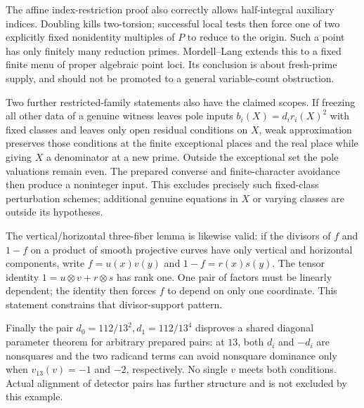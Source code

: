 \documentclass[11pt,a4paper]{article}
\begin{document}
The affine index-restriction proof also correctly allows half-integral
auxiliary indices. Doubling kills two-torsion; successful local tests
then force one of two explicitly fixed nonidentity multiples of $P$ to
reduce to the origin. Such a point has only finitely many reduction
primes. Mordell--Lang extends this to a fixed finite menu of proper
algebraic point loci. Its conclusion is about fresh-prime supply, and
should not be promoted to a general variable-count obstruction.

Two further restricted-family statements also have the claimed scopes.
If freezing all other data of a genuine witness leaves pole inputs
$b_i(X)=d_i r_i(X)^2$ with fixed classes and leaves only open residual
conditions on $X$, weak approximation preserves those conditions at the
finite exceptional places and the real place while giving $X$ a
denominator at a new prime. Outside the exceptional set the pole
valuations remain even. The prepared converse and finite-character
avoidance then produce a noninteger input. This excludes precisely such
fixed-class perturbation schemes; additional genuine equations in $X$
or varying classes are outside its hypotheses.

The vertical/horizontal three-fiber lemma is likewise valid: if the
divisors of $f$ and $1-f$ on a product of smooth projective curves have
only vertical and horizontal components, write
$f=u(x)v(y)$ and $1-f=r(x)s(y)$. The tensor identity
$1=u\otimes v+r\otimes s$ has rank one. One pair of factors must be
linearly dependent; the identity then forces $f$ to depend on only one
coordinate. This statement constrains that divisor-support pattern.

Finally the pair $d_0=112/13^2,d_1=112/13^4$ disproves a shared diagonal
parameter theorem for arbitrary prepared pairs: at $13$, both $d_i$
and $-d_i$ are nonsquares and the two radicand terms can avoid
nonsquare dominance only when $v_{13}(v)=-1$ and $-2$, respectively.
No single $v$ meets both conditions. Actual alignment of detector pairs
has further structure and is not excluded by this example.
\end{document}
